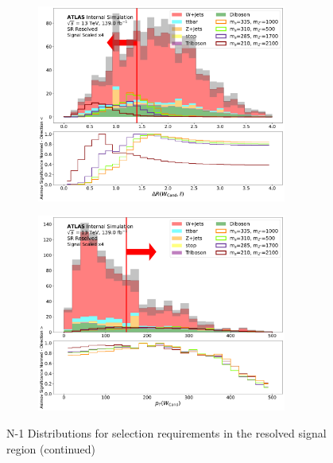 \begin{figure} \ContinuedFloat
    \begin{subfigure}[t]{0.48\textwidth}
    \centering
     \includegraphics[width = 0.9\textwidth]{Figures/5/SR1L_Resolved/dRWl_normSig_N_1.pdf}
    \caption{\drWl}
    \end{subfigure}
    \begin{subfigure}[t]{0.48\textwidth}
    \centering
     \includegraphics[width = 0.9\textwidth]{Figures/5/SR1L_Resolved/WCand_pt_normSig_N_1.pdf}
    \caption{\Wcandpt}
    \end{subfigure}
     \caption{N-1 Distributions for selection requirements in the resolved signal region (continued)}
  \end{figure}


